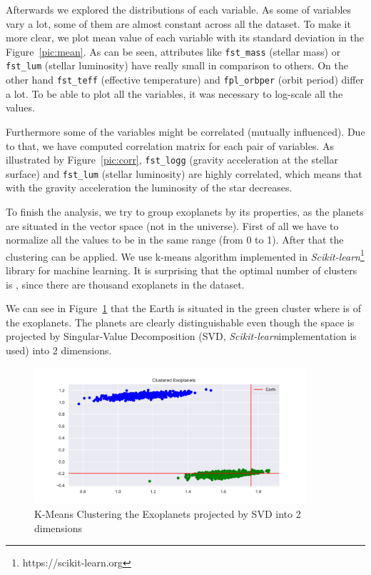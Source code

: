 \documentclass[12p]{article}
\begin{document}
Afterwards we explored the distributions of each variable. As some of variables vary a lot, some of them are almost constant across all the dataset. To make it more clear, we plot mean value of each variable with its standard deviation in the Figure~\ref{pic:mean}. As can be seen, attributes like \verb|fst_mass| (stellar mass) or \verb|fst_lum| (stellar luminosity) have really small in comparison to others. On the other hand \verb|fst_teff| (effective temperature) and \verb|fpl_orbper| (orbit period) differ a lot. To be able to plot all the variables, it was necessary to log-scale all the values. 

Furthermore some of the variables might be correlated (mutually influenced). Due to that, we have computed correlation matrix for each pair of variables. As illustrated by Figure~\ref{pic:corr}, \verb|fst_logg| (gravity acceleration at the stellar surface) and \verb|fst_lum| (stellar luminosity) are highly correlated, which means that with the gravity acceleration the luminosity of the star decreases.

To finish the analysis, we try to group exoplanets by its properties, as the planets are situated in the vector space (not in the universe). First of all we have to normalize all the values to be in the same range (from 0 to 1). After that the clustering can be applied. We use k-means algorithm implemented in \textit{Scikit-learn}\footnote{https://scikit-learn.org} library for machine learning. It is surprising that the optimal number of clusters is , since there are  thousand exoplanets in the dataset.

We can see in Figure~\ref{pic:cluster} that the Earth is situated in the green cluster where is  of the exoplanets. The planets are clearly distinguishable even though the space is projected by Singular-Value Decomposition (SVD, \textit{Scikit-learn}\footnotemark[\value{footnote}] implementation is used) into 2 dimensions.

\begin{figure}\centering
    \includegraphics[width=0.9\textwidth]{graphics/cluster.pdf}
    \caption{K-Means Clustering the Exoplanets projected by SVD into 2 dimensions}
    \label{pic:cluster}
\end{figure}
\end{document}
